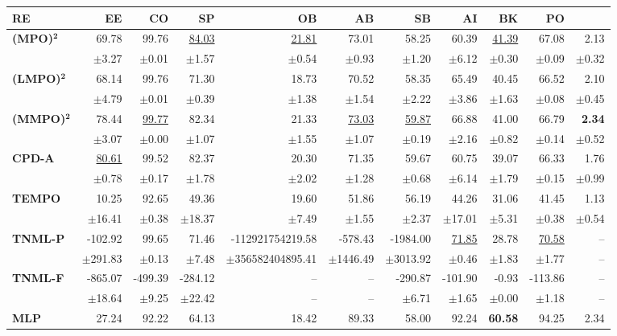 \begin{table}[!htbp]
\centering
\scriptsize
\begin{tabular}{lrrrrrrrrrr}
\toprule
RE & EE & CO & SP & OB & AB & SB & AI & BK & PO \\
\midrule
\textbf{(MPO)}$\bm{^2}$ & 69.78 & 99.76 & \underline{84.03} & \underline{21.81} & 73.01 & 58.25 & 60.39 & \underline{41.39} & 67.08 & 2.13 \\
 & $\pm$3.27 & $\pm$0.01 & $\pm$1.57 & $\pm$0.54 & $\pm$0.93 & $\pm$1.20 & $\pm$6.12 & $\pm$0.30 & $\pm$0.09 & $\pm$0.32 \\
\midrule
\textbf{(LMPO)}$\bm{^2}$ & 68.14 & 99.76 & 71.30 & 18.73 & 70.52 & 58.35 & 65.49 & 40.45 & 66.52 & 2.10 \\
 & $\pm$4.79 & $\pm$0.01 & $\pm$0.39 & $\pm$1.38 & $\pm$1.54 & $\pm$2.22 & $\pm$3.86 & $\pm$1.63 & $\pm$0.08 & $\pm$0.45 \\
\midrule
\textbf{(MMPO)}$\bm{^2}$ & 78.44 & \underline{99.77} & 82.34 & 21.33 & \underline{73.03} & \underline{59.87} & 66.88 & 41.00 & 66.79 & \textbf{2.34} \\
 & $\pm$3.07 & $\pm$0.00 & $\pm$1.07 & $\pm$1.55 & $\pm$1.07 & $\pm$0.19 & $\pm$2.16 & $\pm$0.82 & $\pm$0.14 & $\pm$0.52 \\
\midrule
\textbf{CPD-A} & \underline{80.61} & 99.52 & 82.37 & 20.30 & 71.35 & 59.67 & 60.75 & 39.07 & 66.33 & 1.76 \\
 & $\pm$0.78 & $\pm$0.17 & $\pm$1.78 & $\pm$2.02 & $\pm$1.28 & $\pm$0.68 & $\pm$6.14 & $\pm$1.79 & $\pm$0.15 & $\pm$0.99 \\
\midrule
\textbf{TEMPO} & 10.25 & 92.65 & 49.36 & 19.60 & 51.86 & 56.19 & 44.26 & 31.06 & 41.45 & 1.13 \\
 & $\pm$16.41 & $\pm$0.38 & $\pm$18.37 & $\pm$7.49 & $\pm$1.55 & $\pm$2.37 & $\pm$17.01 & $\pm$5.31 & $\pm$0.38 & $\pm$0.54 \\
\midrule
\textbf{TNML-P} & -102.92 & 99.65 & 71.46 & -112921754219.58 & -578.43 & -1984.00 & \underline{71.85} & 28.78 & \underline{70.58} & -- \\
 & $\pm$291.83 & $\pm$0.13 & $\pm$7.48 & $\pm$356582404895.41 & $\pm$1446.49 & $\pm$3013.92 & $\pm$0.46 & $\pm$1.83 & $\pm$1.77 & -- \\
\midrule
\textbf{TNML-F} & -865.07 & -499.39 & -284.12 & -- & -- & -290.87 & -101.90 & -0.93 & -113.86 & -- \\
 & $\pm$18.64 & $\pm$9.25 & $\pm$22.42 & -- & -- & $\pm$6.71 & $\pm$1.65 & $\pm$0.00 & $\pm$1.18 & -- \\
\midrule
\textbf{MLP} & 27.24 & 92.22 & 64.13 & 18.42 & 89.33 & 58.00 & 92.24 & \textbf{60.58} & 94.25 & 2.34 \\

\end{tabular}
\end{table}
